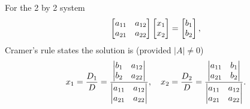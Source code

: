 \begin{theorem}
For the 2 by 2 system
$$
\begin{bmatrix}\begin{matrix} a_{11}\\a_{21} \end{matrix}&\begin{matrix} a_{12}\\a_{22} \end{matrix} \end{bmatrix}
\begin{bmatrix}\begin{matrix} x_{1}\\x_{2} \end{matrix} \end{bmatrix}
=
\begin{bmatrix}\begin{matrix} b_{1}\\b_{2} \end{matrix} \end{bmatrix},
$$
Cramer's rule states the solution is (provided $|A|\neq 0$) 
$$
x_1 = \frac{D_1}{D}=\frac{\begin{vmatrix}\begin{matrix} b_1\\b_2 \end{matrix}&\begin{matrix} a_{12}\\a_{22} \end{matrix} \end{vmatrix}}{\begin{vmatrix}\begin{matrix} a_{11}\\a_{21} \end{matrix}&\begin{matrix} a_{12}\\a_{22} \end{matrix} \end{vmatrix}},
\quad 
x_2 = \frac{D_2}{D}=\frac{\begin{vmatrix}\begin{matrix} a_{11}\\a_{21} \end{matrix}&\begin{matrix} b_1\\b_2 \end{matrix}\end{vmatrix}}{\begin{vmatrix}\begin{matrix} a_{11}\\a_{21} \end{matrix}&\begin{matrix} a_{12}\\a_{22} \end{matrix} \end{vmatrix}}
.$$

\end{theorem}
